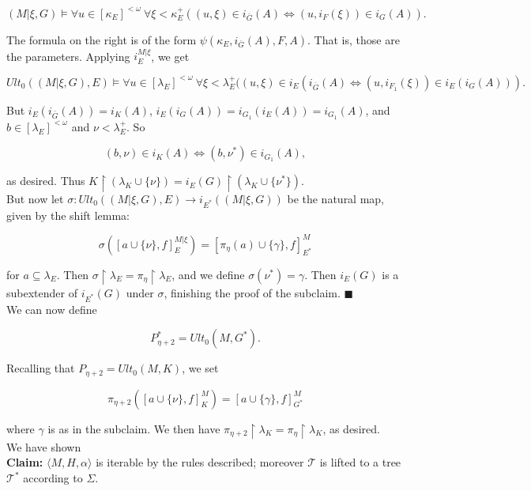 \documentclass[12pt]{article}
\begin{document}
\[
(M | \xi , G ) \models \forall u \in [ \kappa_E ]^{< \omega } \ \forall \xi < \kappa_E^+ ((u, \xi) \in i_{\bar{G}}(A) \Longleftrightarrow (u, i_F (\xi)) \in i_G (A)).
\]

The formula on the right is of the form $\psi ( \kappa_E , i_{\bar{G}} (A) , F, A)$.  That is, those are the parameters.  Applying $i_E^{M | \xi}$, we get

\[
Ult_0 ((M | \xi , G ), E) \models \forall u \in [ \lambda_E ]^{< \omega} \ \forall \xi < \lambda_E^+ ((u, \xi) \in i_E (i_{\bar{G}} (A) \Longleftrightarrow (u, i_{F_1}(\xi)) \in i_E (i_G (A))).
\]

But $i_E (i_{\bar{G}} (A)) = i_K (A)$, $i_E (i_G (A)) = i_{G_1} (i_E (A)) = i_{G_1}(A)$, and $b \in [ \lambda_E ]^{< \omega }$ and $\nu < \lambda_E^+$.  So

\[
(b, \nu ) \in i_K (A) \Longleftrightarrow (b, \nu^*) \in i_{G_1} (A),
\]

as desired.  Thus $K \restriction (\lambda_K \cup \{ \nu \} ) = i_E (G) \restriction (\lambda_K \cup \{ \nu^* \} )$.\\

But now let $\sigma : Ult_0 ((M | \xi , G ), E) \longrightarrow i_{E^*} (( M | \xi , G))$ be the natural map, given by the shift lemma:

\[
\sigma ( [a \cup \{ \nu \} , f ]_E^{M | \xi} ) = [ \pi_\eta (a) \cup \{ \gamma \} , f ]_{E^*}^M
\]

for $a \subseteq \lambda_E$.  Then $\sigma \restriction \lambda_E = \pi_\eta \restriction \lambda_E$, and we define $\sigma (\nu^* ) = \gamma$.  Then $i_E (G)$ is a subextender of $i_{E^*} (G)$ under $\sigma$, finishing the proof of the subclaim. $\blacksquare$\\

We can now define

\[
P_{\eta + 2}^* = Ult_0 (M, G^* ).
\]

Recalling that $P_{\eta + 2} = Ult_0 (M, K)$, we set

\[
\pi_{\eta + 2} ( [ a \cup \{ \nu \} , f ]_K^M ) = [ a \cup \{ \gamma \} , f ]_{G^*}^M
\]

where $\gamma$ is as in the subclaim.  We then have $\pi_{\eta + 2} \restriction \lambda_K = \pi_\eta \restriction \lambda_K$, as desired.\\

We have shown\\

\textbf{Claim:} $\langle M, H, \alpha \rangle$ is iterable by the rules described; moreover $\mathscr{T}$ is lifted to a tree $\mathscr{T}^*$ according to $\Sigma$.\\
\end{document}
